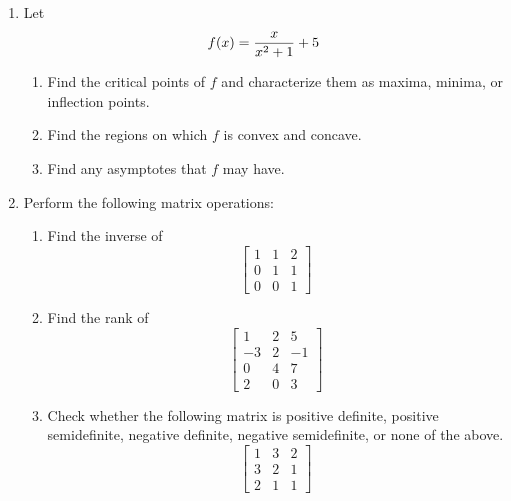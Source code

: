 \documentclass[11pt]{article}
\begin{document}
\begin{enumerate}
\vspace{.2in}
\item Let $$f(x)={{x}\over{x^2+1}}+5$$
\begin{enumerate}
\item Find the critical points of $f$ and characterize them as maxima, minima, or inflection points.
\item Find the regions on which $f$ is convex and concave.
\item Find any asymptotes that $f$ may have.

\end{enumerate}

\item Perform the following matrix operations:

\begin{enumerate}
\item Find the inverse of $$\begin{bmatrix}1 & 1& 2\\ 0& 1& 1\\0&0&1
\end{bmatrix}$$

\item Find the rank of 
$$\begin{bmatrix} 
1& 2& 5\\
-3& 2& -1\\
0& 4& 7\\
2& 0& 3
\end{bmatrix}$$


\item Check whether the following matrix is positive definite, positive semidefinite, negative definite, negative semidefinite, or none of the above.
$$\begin{bmatrix}
1& 3& 2\\3& 2& 1\\2& 1& 1
\end{bmatrix}$$
\end{enumerate}


\end{enumerate}
\end{document}
